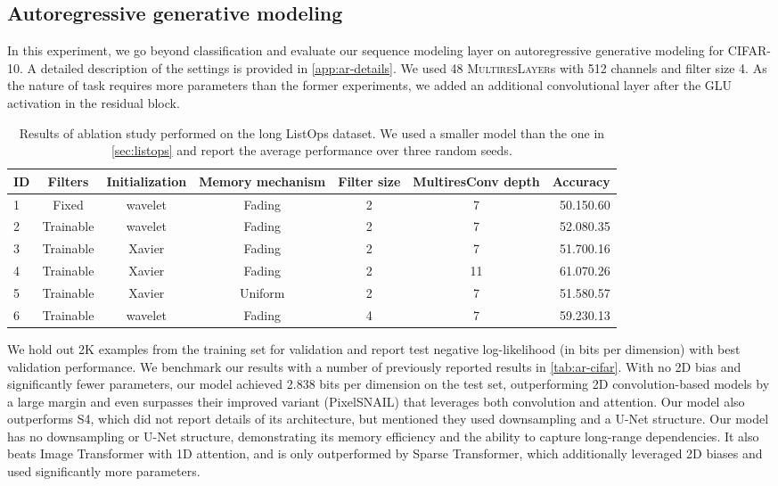 \documentclass{article}
\theoremstyle{plain}
\theoremstyle{definition}
\theoremstyle{remark}
\newcommand{\ourlayer}{\textsc{MultiresLayer}}
\begin{document}
\subsection{Autoregressive generative modeling}


In this experiment, we go beyond classification and evaluate our sequence modeling layer on autoregressive generative modeling for CIFAR-10. 
A detailed description of the settings is provided in \cref{app:ar-details}. 
We used 48 \ourlayer s with 512 channels and filter size 4. 
As the nature of task requires more parameters than the former experiments, we added an additional  convolutional layer after the GLU activation in the residual block. 

\begin{table*}[h]
    \vspace{-0.08in}
    \caption{Results of ablation study performed on the long ListOps dataset. We used a smaller model than the one in \cref{sec:listops} and report the average performance over three random seeds. }
    \label{tab:ablation}
    \vskip 0.1in
    \centering
    \begin{small}
        \begin{tabular}{@{}lcccccr}
            \toprule
            ID & Filters & Initialization & Memory mechanism & Filter size & MultiresConv depth & Accuracy \\
            \midrule
            1 & Fixed & wavelet & Fading &  2  & 7 & 50.150.60 \\
            2 & Trainable & wavelet & Fading & 2 & 7 & 52.080.35 \\
            3 & Trainable & Xavier & Fading & 2 &  7 & 51.700.16 \\
            4 & Trainable & Xavier & Fading & 2 & 11 & 61.070.26 \\
            5 & Trainable & Xavier & Uniform & 2 & 7 & 51.580.57 \\
            6 & Trainable & wavelet & Fading & 4 & 7 & 59.230.13 \\
            \bottomrule
        \end{tabular}
    \end{small}
\end{table*}

We hold out 2K examples from the training set for validation and report test negative log-likelihood (in bits per dimension) with best validation performance.
We benchmark our results with a number of previously reported results in \cref{tab:ar-cifar}. 
With no 2D bias and significantly fewer parameters, our model achieved 2.838 bits per dimension on the test set, outperforming 2D convolution-based models by a large margin and even surpasses their improved variant (PixelSNAIL) that leverages both convolution and attention. 
Our model also outperforms S4, which did not report details of its architecture, but mentioned they used downsampling and a U-Net structure. 
Our model has no downsampling or U-Net structure, demonstrating its memory efficiency and the ability to capture long-range dependencies. 
It also beats Image Transformer with 1D attention, and is only outperformed by Sparse Transformer, which additionally leveraged 2D biases and used significantly more parameters. 
\end{document}
